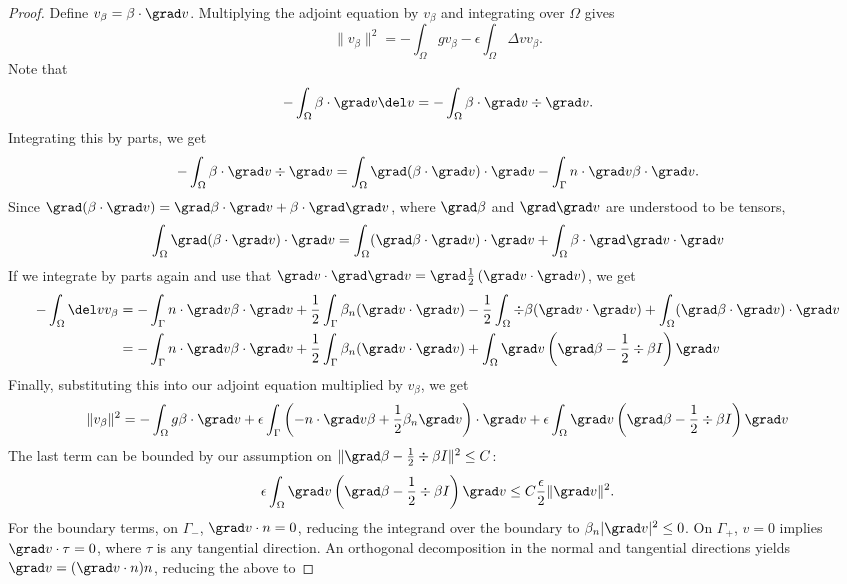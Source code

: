 \begin{proof}
Define $v_\beta = \beta\cdot \grad v$.  Multiplying the adjoint equation  by $v_\beta$ and integrating over $\Omega$ gives
\[
\|v_\beta\|^2 = -\int_\Omega g v_\beta - \epsilon \int_\Omega \Delta v v_\beta.
\]
Note that 
\[
-\int_{\Omega} \beta\cdot \grad v \del v = -\int_{\Omega} \beta\cdot \grad v \div \grad v.
\]
Integrating this by parts, we get
\[
-\int_{\Omega} \beta\cdot \grad v \div \grad v = \int_{\Omega}\grad (\beta\cdot \grad v) \cdot \grad v  - \int_{\Gamma}n\cdot \grad v \beta\cdot\grad v.
\]
Since $\grad (\beta \cdot \grad v) = \grad \beta \cdot \grad v + \beta \cdot \grad \grad v$, where $\grad \beta$ and $\grad \grad v$ are understood to be tensors, 
\[
\int_{\Omega}\grad (\beta\cdot \grad v) \cdot \grad v = \int_{\Omega}(\grad \beta\cdot \grad v) \cdot \grad v + \int_{\Omega}\beta\cdot \grad\grad v \cdot \grad v 
\]
If we integrate by parts again and use that $\grad v \cdot \grad \grad v = \grad\frac{1}{2}\left(\grad v\cdot \grad v\right)$, we get
\begin{align*}
-\int_{\Omega}  \del vv_\beta &= - \int_{\Gamma}n\cdot \grad v \beta\cdot\grad v + \frac{1}{2}\int_{\Gamma}\beta_n (\grad v \cdot \grad v ) - \frac{1}{2}\int_{\Omega}\div \beta (\grad v \cdot \grad v ) + \int_{\Omega}(\grad \beta\cdot \grad v) \cdot \grad v\\
&= - \int_{\Gamma}n\cdot \grad v \beta\cdot\grad v + \frac{1}{2}\int_{\Gamma}\beta_n (\grad v \cdot \grad v ) + \int_{\Omega} \grad v \left(\grad \beta - \frac{1}{2}\div \beta I\right)\grad v
\end{align*}
Finally, substituting this into our adjoint equation multiplied by $v_\beta$, we get
\[
\| v_\beta\|^2 = -\int_{\Omega}g\beta\cdot \grad v +  \epsilon\int_{\Gamma}  \left( -n\cdot \grad v \beta + \frac{1}{2}\beta_n \grad v \right) \cdot \grad v + \epsilon\int_{\Omega} \grad v \left(\grad \beta - \frac{1}{2}\div \beta I\right)\grad v
\]
The last term can be bounded by our assumption on $\|\grad \beta - \frac{1}{2}\div \beta I\|^2 \leq C$:
\[
\epsilon \int_{\Omega} \grad v \left(\grad \beta - \frac{1}{2}\div \beta I\right)\grad v \leq C\frac{\epsilon}{2} \|\grad v\|^2.
\]
For the boundary terms, on $\Gamma_-$, $\grad v\cdot n = 0$, reducing the integrand over the boundary to $\beta_n|\grad v|^2 \leq 0$.  On $\Gamma_+$, $v=0$ implies $\grad v \cdot \tau = 0$, where $\tau$ is any tangential direction.  An orthogonal decomposition in the normal and tangential directions yields $\grad v = (\grad v \cdot n) n$, reducing the above to 

\end{proof}
